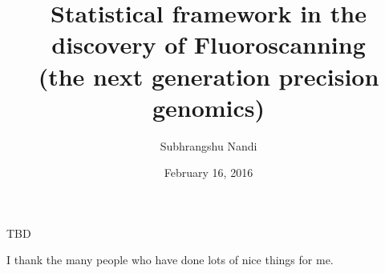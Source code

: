 

\clearpage{}  %


\title{Statistical framework in the discovery of Fluoroscanning \\ (the next generation precision genomics)}
\author{Subhrangshu Nandi}
\date{February 16, 2016}
\prelim
\maketitle

\copyrightpage

\begin{dedication}
TBD
\end{dedication}

\begin{acknowledgments}
I thank the many people who have done lots of nice things for me.
\end{acknowledgments}

\tableofcontents
\listoftables
\listoffigures

